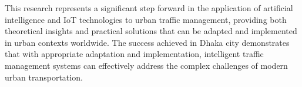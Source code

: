 This research represents a significant step forward in the application of artificial intelligence and IoT technologies to urban traffic management, providing both theoretical insights and practical solutions that can be adapted and implemented in urban contexts worldwide. The success achieved in Dhaka city demonstrates that with appropriate adaptation and implementation, intelligent traffic management systems can effectively address the complex challenges of modern urban transportation. 